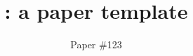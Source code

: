 \title{\sys: a paper template}

\ifdefined\DRAFT
 \pagestyle{fancyplain}
 \rhead{\thedate}
\fi

\author{Paper \#123}

